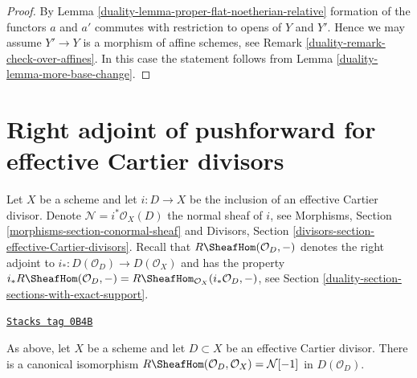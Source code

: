 \begin{proof}

By Lemma \ref{duality-lemma-proper-flat-noetherian-relative} formation of the
functors $a$ and $a'$ commutes with restriction to opens of $Y$ and $Y'$.
Hence we may assume $Y' \to Y$ is a morphism of affine schemes, see
Remark \ref{duality-remark-check-over-affines}. In this
case the statement follows from Lemma \ref{duality-lemma-more-base-change}.
\end{proof}

\section{Right adjoint of pushforward for effective Cartier divisors}
\label{duality-section-dualizing-Cartier}
Let $X$ be a scheme and let $i : D \to X$ be the inclusion of an
effective Cartier divisor. Denote $\mathcal{N} = i^*\mathcal{O}_X(D)$
the normal sheaf of $i$, see
Morphisms, Section \ref{morphisms-section-conormal-sheaf}
and
Divisors, Section \ref{divisors-section-effective-Cartier-divisors}.
Recall that $R\SheafHom(\mathcal{O}_D, -)$
denotes the right adjoint to $i_* : D(\mathcal{O}_D) \to D(\mathcal{O}_X)$
and has the property
$i_*R\SheafHom(\mathcal{O}_D, -) =
R\SheafHom_{\mathcal{O}_X}(i_*\mathcal{O}_D, -)$,
see Section \ref{duality-section-sections-with-exact-support}.

\begin{lemma}
\label{duality-lemma-compute-for-effective-Cartier}
\href{https://stacks.math.columbia.edu/tag/0B4B}{\texttt{Stacks tag 0B4B}}

As above, let $X$ be a scheme and let $D \subset X$ be an
effective Cartier divisor. There is a canonical isomorphism
$R\SheafHom(\mathcal{O}_D, \mathcal{O}_X) = \mathcal{N}[-1]$
in $D(\mathcal{O}_D)$.
\end{lemma}

